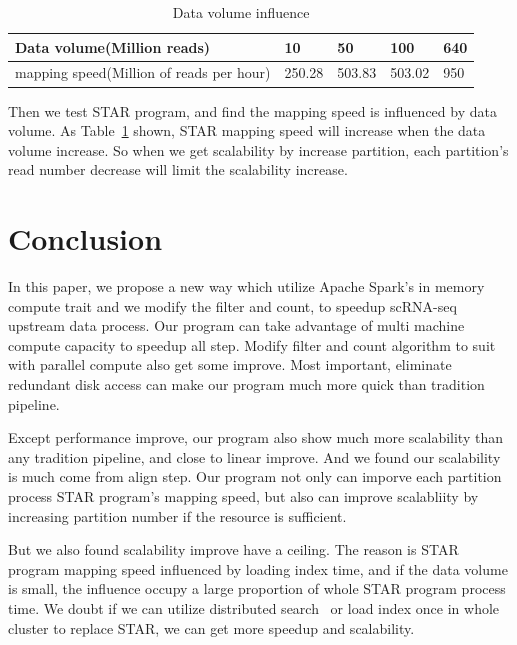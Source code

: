 \documentclass[runningheads]{llncs}
\begin{document}
\begin{table}
  \centering
  \caption{Data volume influence}\label{tab3}
  \begin{tabular}{l | l | l | l | l}
  \hline
  Data volume(Million reads) & 10 & 50 & 100 & 640 \\
  \hline
  mapping speed(Million of reads per hour) & 250.28 & 503.83 & 503.02 & 950 \\
  \hline
  \end{tabular}
\end{table}

Then we test STAR program, and find the mapping speed is influenced by data volume.
As Table~\ref{tab3} shown, STAR mapping speed will increase when the data volume increase.
So when we get scalability by increase partition, each partition's read number decrease will limit the scalability increase.
\section{Conclusion}
In this paper, we propose a new way which utilize Apache Spark's in memory compute trait and we modify the filter and count, to speedup scRNA-seq upstream data process.
Our program can take advantage of multi machine compute capacity to speedup all step.
Modify filter and count algorithm to suit with parallel compute also get some improve.
Most important, eliminate redundant disk access can make our program much more quick than tradition pipeline.

Except performance improve, our program also show much more scalability than any tradition pipeline, and close to linear improve.
And we found our scalability is much come from align step.
Our program not only can imporve each partition process STAR program's mapping speed, but also can improve scalabliity by increasing partition number if the resource is sufficient.

But we also found scalability improve have a ceiling.
The reason is STAR program mapping speed influenced by loading index time, and if the data volume is small, the influence occupy a large proportion of whole STAR program process time.
We doubt if we can utilize distributed search~\cite{divya2013elasticsearch} or load index once in whole cluster to replace STAR, we can get more speedup and scalability.
\end{document}
